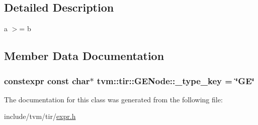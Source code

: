 \subsection{Detailed Description}
a $>$= b 

\subsection{Member Data Documentation}
\subsubsection[{\texorpdfstring{\+\_\+type\+\_\+key}{_type_key}}]{\setlength{\rightskip}{0pt plus 5cm}constexpr const char$\ast$ tvm\+::tir\+::\+G\+E\+Node\+::\+\_\+type\+\_\+key = \char`\"{}GE\char`\"{}\hspace{0.3cm}{\ttfamily [static]}}\hypertarget{classtvm_1_1tir_1_1GENode_a43472b79fb4e4cc540ecf441d0cdcd1b}{}\label{classtvm_1_1tir_1_1GENode_a43472b79fb4e4cc540ecf441d0cdcd1b}


The documentation for this class was generated from the following file\+:\begin{DoxyCompactItemize}
\item 
include/tvm/tir/\hyperlink{tir_2expr_8h}{expr.\+h}\end{DoxyCompactItemize}
